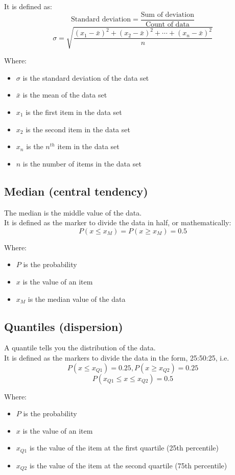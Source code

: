 \documentclass[11pt]{article}
\begin{document}
It is defined as:
\[\text{Standard deviation} = \frac{\text{Sum of deviation}}{\text{Count of data}}\]
\[\sigma = \sqrt{\frac{(x_1 - \bar{x})^2 + (x_2 - \bar{x})^2 + \cdots + (x_n - \bar{x})^2}{n}}\]

Where:
\begin{itemize}
\item \(\sigma\) is the standard deviation of the data set
\item \(\bar{x}\) is the mean of the data set
\item \(x_1\) is the first item in the data set
\item \(x_2\) is the second item in the data set
\item \(x_n\) is the \(n^{th}\) item in the data set
\item \(n\) is the number of items in the data set
\end{itemize}
\subsection{Median (central tendency)}
\label{sec:orgc009b3e}
The median is the middle value of the data.  \\

It is defined as the marker to divide the data in half, or mathematically:
\[P \left(x \le x_M \right) = P \left( x \ge x_M \right) = 0.5\]

Where:
\begin{itemize}
\item \(P\) is the probability
\item \(x\) is the value of an item
\item \(x_M\) is the median value of the data
\end{itemize}
\subsection{Quantiles (dispersion)}
\label{sec:org33868bc}
A quantile tells you the distribution of the data.  \\

It is defined as the markers to divide the data in the form, 25:50:25, i.e.
\[P \left(x \le x_{Q1}\right) = 0.25, P \left(x \ge x_{Q2} \right) = 0.25\]
\[P(x_{Q1} \le x \le x_{Q2}) = 0.5\]

Where:
\begin{itemize}
\item \(P\) is the probability
\item \(x\) is the value of an item
\item \(x_{Q1}\) is the value of the item at the first quartile (25th percentile)
\item \(x_{Q2}\) is the value of the item at the second quartile (75th percentile)
\end{itemize}
\end{document}
